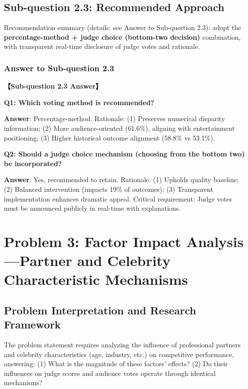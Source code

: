 \subsection{Sub-question 2.3: Recommended Approach}

Recommendation summary (details: see Answer to Sub-question 2.3): adopt the \textbf{percentage-method + judge choice (bottom-two decision)} combination, with transparent real-time disclosure of judge votes and rationale.

\subsubsection{Answer to Sub-question 2.3}

\begin{answerbox}
\noindent\textbf{【Sub-question 2.3 Answer】}

\textbf{Q1: Which voting method is recommended?}

\textbf{Answer}: Percentage-method. Rationale: (1) Preserves numerical disparity information; (2) More audience-oriented (61.6\%), aligning with entertainment positioning; (3) Higher historical outcome alignment (58.8\% vs 53.1\%).

\textbf{Q2: Should a judge choice mechanism (choosing from the bottom two) be incorporated?}

\textbf{Answer}: Yes, recommended to retain. Rationale: (1) Upholds quality baseline; (2) Balanced intervention (impacts 19\% of outcomes); (3) Transparent implementation enhances dramatic appeal. Critical requirement: Judge votes must be announced publicly in real-time with explanations.
\end{answerbox}

\section{Problem 3: Factor Impact Analysis---Partner and Celebrity Characteristic Mechanisms}

\subsection{Problem Interpretation and Research Framework}

The problem statement requires analyzing the influence of professional partners and celebrity characteristics (age, industry, etc.) on competitive performance, answering: (1) What is the magnitude of these factors' effects? (2) Do their influences on judge scores and audience votes operate through identical mechanisms?

